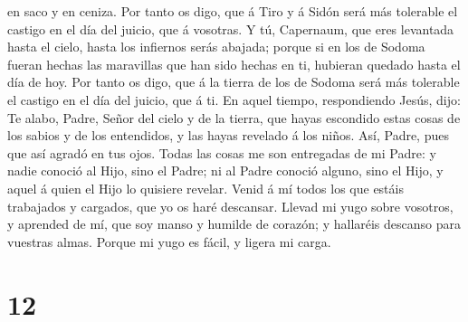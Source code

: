 en saco y en ceniza.  Por tanto os digo, que á Tiro y á
Sidón será más tolerable el castigo en el día del juicio, que á
vosotras.  Y tú, Capernaum, que eres levantada hasta el
cielo, hasta los infiernos serás abajada; porque si en los de Sodoma
fueran hechas las maravillas que han sido hechas en ti, hubieran quedado
hasta el día de hoy.  Por tanto os digo, que á la tierra
de los de Sodoma será más tolerable el castigo en el día del juicio, que
á ti.  En aquel tiempo, respondiendo Jesús, dijo: Te
alabo, Padre, Señor del cielo y de la tierra, que hayas escondido estas
cosas de los sabios y de los entendidos, y las hayas revelado á los
niños.  Así, Padre, pues que así agradó en tus ojos.
 Todas las cosas me son entregadas de mi Padre: y nadie
conoció al Hijo, sino el Padre; ni al Padre conoció alguno, sino el
Hijo, y aquel á quien el Hijo lo quisiere revelar.  Venid
á mí todos los que estáis trabajados y cargados, que yo os haré
descansar.  Llevad mi yugo sobre vosotros, y aprended de
mí, que soy manso y humilde de corazón; y hallaréis descanso para
vuestras almas.  Porque mi yugo es fácil, y ligera mi
carga.

\hypertarget{section-11}{%
\section{12}\label{section-11}}

